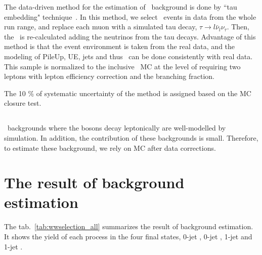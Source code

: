 The data-driven method for the estimation of \ztt\ background is done by 
``tau embedding" technique~\cite{}. In this method, we select \dymm\ events in data
from the whole run range, 
and replace each muon with a simulated tau decay, $\tau \rightarrow l\bar{\nu}_l\nu_\tau$. 
Then, the \met\ is re-calculated adding the neutrinos from the tau decays. 
Advantage of this method is that the event environment is taken from the real data, 
and the modeling of PileUp, UE, jets and thus \met\ can be done consistently 
with real data. This sample is normalized to the inclusive \ztt\ MC 
at the level of requiring two leptons with lepton efficiency correction
and the branching fraction.

The 10 \% of systematic uncertainty of the method is assigned based on the MC closure test. 

\subsection{\vv} 

\vv\ backgrounds where the bosons decay leptonically are well-modelled by simulation.
In addition, the contribution of these backgrounds is small. Therefore, to estimate these 
background, we rely on MC after data corrections.  



\section{ The result of background estimation }

The tab.~\ref{tab:wwselection_all} summarizes the result of background estimation. 
It shows the yield of each process in the four final states, 0-jet \SF, 0-jet \DF,  
1-jet \SF and 1-jet \DF.  

